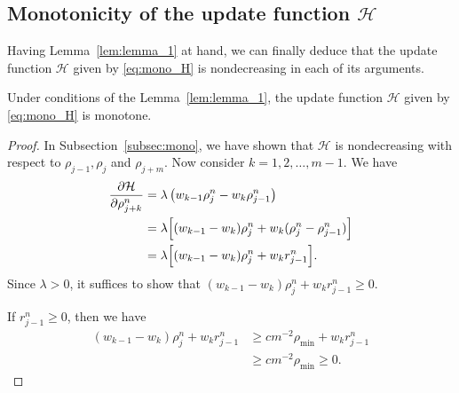 \subsection{Monotonicity of the update function $\mathcal{H}$}
Having Lemma~\ref{lem:lemma_1} at hand, we can finally deduce that the update function $\mathcal{H}$ given by \eqref{eq:mono_H} is nondecreasing in each of its arguments.
\begin{proposition}\label{prop:mono_of_H}
    Under conditions of the Lemma~\ref{lem:lemma_1}, the update function $\mathcal{H}$ given by \eqref{eq:mono_H} is monotone.
\end{proposition}
\begin{proof}
    In Subsection~\ref{subsec:mono}, we have shown that $\mathcal{H}$ is nondecreasing with respect to $\rho_{j-1}, \rho_{j}$ and $\rho_{j+m}$. Now consider $k= 1,2,\dots,m-1$. We have
    \begin{align*}
        \frac{\partial \mathcal{H}}{\partial \rho_{j+k}^n} & = \lambda\left( w_{k-1}\rho_j^n -w_k\rho_{j-1}^n\right)                      \\
                                                           & =\lambda \Bigl[(w_{k-1}- w_k) \rho_j^n + w_k(\rho_j^n - \rho_{j-1}^n )\Bigr] \\
                                                           & = \lambda \Bigl[(w_{k-1}- w_k) \rho_j^n + w_k r_{j-1}^n\Bigr].
    \end{align*}
    Since $\lambda >0$, it suffices to show that $(w_{k-1}- w_k) \rho_j^n + w_k r_{j-1}^n \geq 0$.

    If $r_{j-1}^n \geq 0 $, then we have
    \begin{align*}
        (w_{k-1}- w_k) \rho_j^n + w_k r_{j-1}^n & \geq cm^{-2}\rho_{\min} + w_k r_{j-1}^n \\
                                                & \geq cm^{-2}\rho_{\min}  \geq 0.
    \end{align*}


\end{proof}
